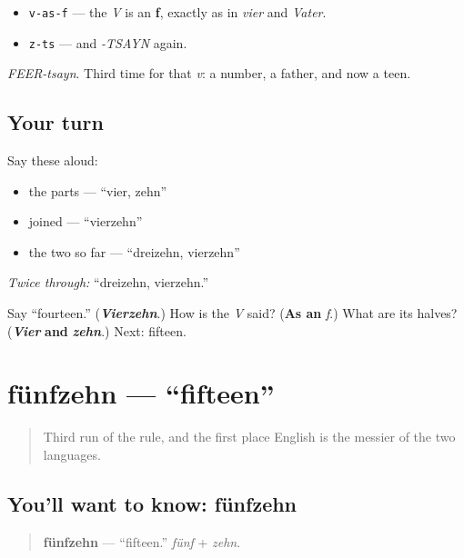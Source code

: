 \begin{sounds}
\begin{itemize}
\raggedright
  \item \texttt{v-as-f} — the \emph{V} is an \textbf{f}, exactly as in \emph{vier} and \emph{Vater}.
  \item \texttt{z-ts} — and \emph{-TSAYN} again.
\end{itemize}

\emph{FEER-tsayn}. Third time for that \emph{v}: a number, a father, and now a teen.
\end{sounds}

\subsection*{Your turn}
Say these aloud:

\begin{itemize}
\raggedright
  \item the parts — \textquotedblleft{}vier, zehn\textquotedblright{}
  \item joined — \textquotedblleft{}vierzehn\textquotedblright{}
  \item the two so far — \textquotedblleft{}dreizehn, vierzehn\textquotedblright{}
\end{itemize}

\emph{Twice through:} \textquotedblleft{}dreizehn, vierzehn.\textquotedblright{}

\begin{tcolorbox}[breakable,colback=teal!4,colframe=teal!35!black,title={Before you move on}]
Say \textquotedblleft{}fourteen.\textquotedblright{} (\emph{\textbf{Vierzehn}}.) How is the \emph{V} said? (\textbf{As an} \emph{f}.) What are its halves? (\emph{\textbf{Vier}} \textbf{and} \emph{\textbf{zehn}}.) Next: fifteen.
\end{tcolorbox}
\section[fünfzehn]{fünfzehn — \textquotedblleft{}fifteen\textquotedblright{}}

\label{lesson:GE-C12-fuenfzehn}



\begin{quote}
Third run of the rule, and the first place English is the messier of the two languages.
\end{quote}

\subsection*{You'll want to know: fünfzehn}
\begin{quote}
\textbf{fünfzehn} — \textquotedblleft{}fifteen.\textquotedblright{} \emph{fünf} + \emph{zehn}.
\end{quote}

